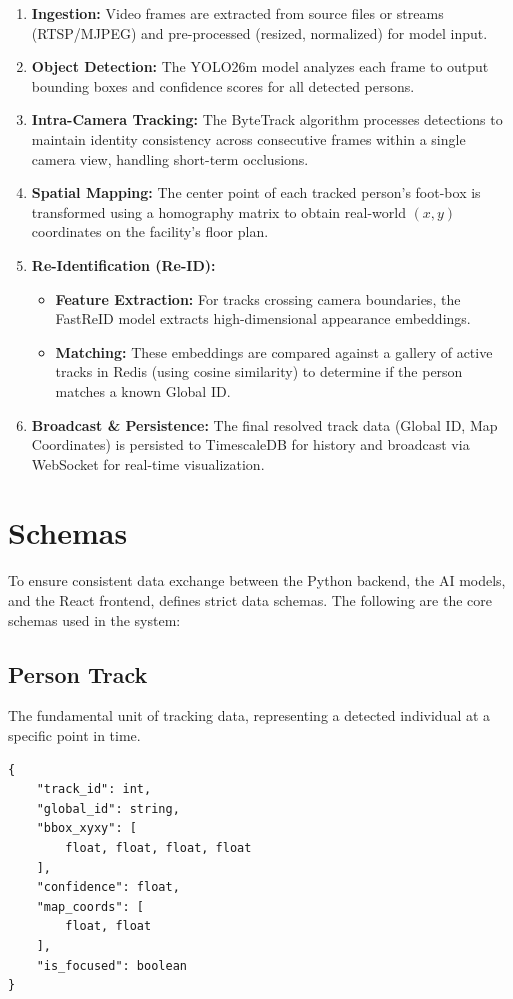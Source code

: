 \begin{enumerate}[leftmargin=80pt]
    \item \textbf{Ingestion:} Video frames are extracted from source files or streams (RTSP/MJPEG) and pre-processed (resized, normalized) for model input.
    \item \textbf{Object Detection:} The YOLO26m model analyzes each frame to output bounding boxes and confidence scores for all detected persons.
    \item \textbf{Intra-Camera Tracking:} The ByteTrack algorithm processes detections to maintain identity consistency across consecutive frames within a single camera view, handling short-term occlusions.
    \item \textbf{Spatial Mapping:} The center point of each tracked person's foot-box is transformed using a homography matrix to obtain real-world $(x, y)$ coordinates on the facility's floor plan.
    \item \textbf{Re-Identification (Re-ID):}
    \begin{itemize}
        \item \textbf{Feature Extraction:} For tracks crossing camera boundaries, the FastReID model extracts high-dimensional appearance embeddings.
        \item \textbf{Matching:} These embeddings are compared against a gallery of active tracks in Redis (using cosine similarity) to determine if the person matches a known Global ID.
    \end{itemize}
    \item \textbf{Broadcast \& Persistence:} The final resolved track data (Global ID, Map Coordinates) is persisted to TimescaleDB for history and broadcast via WebSocket for real-time visualization.
\end{enumerate}

\section{Schemas}
\label{section:data-schema}

To ensure consistent data exchange between the Python backend, the AI models, and the React frontend, \usevar{\srsTitle} defines strict data schemas. The following are the core schemas used in the system:

\subsection{Person Track}
\label{schema:person-track}
The fundamental unit of tracking data, representing a detected individual at a specific point in time.
\begin{verbatim}
{
    "track_id": int,
    "global_id": string,
    "bbox_xyxy": [
        float, float, float, float 
    ],
    "confidence": float,
    "map_coords": [
        float, float
    ],
    "is_focused": boolean
}
\end{verbatim}

